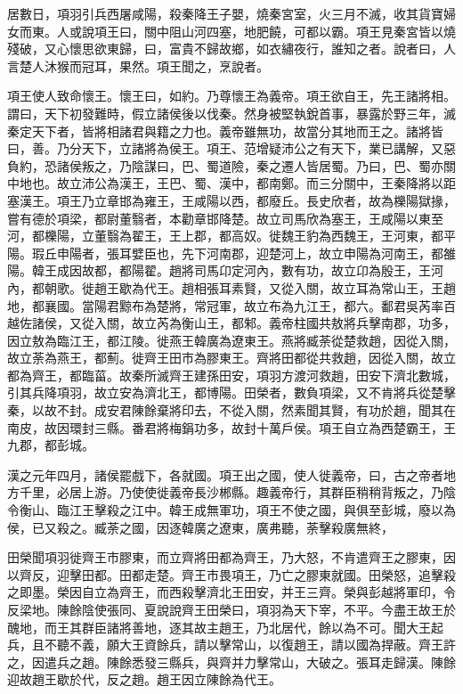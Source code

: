 居數日，項羽引兵西屠咸陽，殺秦降王子嬰，燒秦宮室，火三月不滅，收其貨寶婦女而東。人或說項王曰，關中阻山河四塞，地肥饒，可都以霸。項王見秦宮皆以燒殘破，又心懷思欲東歸，曰，富貴不歸故鄉，如衣繡夜行，誰知之者。說者曰，人言楚人沐猴而冠耳，果然。項王聞之，烹說者。

項王使人致命懷王。懷王曰，如約。乃尊懷王為義帝。項王欲自王，先王諸將相。謂曰，天下初發難時，假立諸侯後以伐秦。然身被堅執銳首事，暴露於野三年，滅秦定天下者，皆將相諸君與籍之力也。義帝雖無功，故當分其地而王之。諸將皆曰，善。乃分天下，立諸將為侯王。項王、范增疑沛公之有天下，業已講解，又惡負約，恐諸侯叛之，乃陰謀曰，巴、蜀道險，秦之遷人皆居蜀。乃曰，巴、蜀亦關中地也。故立沛公為漢王，王巴、蜀、漢中，都南鄭。而三分關中，王秦降將以距塞漢王。項王乃立章邯為雍王，王咸陽以西，都廢丘。長史欣者，故為櫟陽獄掾，嘗有德於項梁，都尉董翳者，本勸章邯降楚。故立司馬欣為塞王，王咸陽以東至河，都櫟陽，立董翳為翟王，王上郡，都高奴。徙魏王豹為西魏王，王河東，都平陽。瑕丘申陽者，張耳嬖臣也，先下河南郡，迎楚河上，故立申陽為河南王，都雒陽。韓王成因故都，都陽翟。趙將司馬卬定河內，數有功，故立卬為殷王，王河內，都朝歌。徙趙王歇為代王。趙相張耳素賢，又從入關，故立耳為常山王，王趙地，都襄國。當陽君黥布為楚將，常冠軍，故立布為九江王，都六。鄱君吳芮率百越佐諸侯，又從入關，故立芮為衡山王，都邾。義帝柱國共敖將兵擊南郡，功多，因立敖為臨江王，都江陵。徙燕王韓廣為遼東王。燕將臧荼從楚救趙，因從入關，故立荼為燕王，都薊。徙齊王田市為膠東王。齊將田都從共救趙，因從入關，故立都為齊王，都臨菑。故秦所滅齊王建孫田安，項羽方渡河救趙，田安下濟北數城，引其兵降項羽，故立安為濟北王，都博陽。田榮者，數負項梁，又不肯將兵從楚擊秦，以故不封。成安君陳餘棄將印去，不從入關，然素聞其賢，有功於趙，聞其在南皮，故因環封三縣。番君將梅鋗功多，故封十萬戶侯。項王自立為西楚霸王，王九郡，都彭城。

漢之元年四月，諸侯罷戲下，各就國。項王出之國，使人徙義帝，曰，古之帝者地方千里，必居上游。乃使使徙義帝長沙郴縣。趣義帝行，其群臣稍稍背叛之，乃陰令衡山、臨江王擊殺之江中。韓王成無軍功，項王不使之國，與俱至彭城，廢以為侯，已又殺之。臧荼之國，因逐韓廣之遼東，廣弗聽，荼擊殺廣無終，

田榮聞項羽徙齊王市膠東，而立齊將田都為齊王，乃大怒，不肯遣齊王之膠東，因以齊反，迎擊田都。田都走楚。齊王市畏項王，乃亡之膠東就國。田榮怒，追擊殺之即墨。榮因自立為齊王，而西殺擊濟北王田安，并王三齊。榮與彭越將軍印，令反梁地。陳餘陰使張同、夏說說齊王田榮曰，項羽為天下宰，不平。今盡王故王於醜地，而王其群臣諸將善地，逐其故主趙王，乃北居代，餘以為不可。聞大王起兵，且不聽不義，願大王資餘兵，請以擊常山，以復趙王，請以國為捍蔽。齊王許之，因遣兵之趙。陳餘悉發三縣兵，與齊并力擊常山，大破之。張耳走歸漢。陳餘迎故趙王歇於代，反之趙。趙王因立陳餘為代王。

